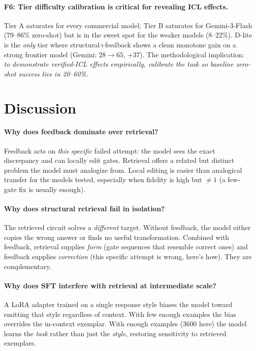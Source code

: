 \documentclass[11pt]{article}
\begin{document}
\paragraph{F6: Tier difficulty calibration is critical for revealing ICL effects.}
Tier A saturates for every commercial model; Tier B saturates for Gemini-3-Flash (79--86\% zero-shot) but is in the sweet spot for the weaker models (8--22\%). D-lite is the \emph{only} tier where structural+feedback shows a clean monotone gain on a strong frontier model (Gemini: $28\to65$, $+37$). The methodological implication: \emph{to demonstrate verified-ICL effects empirically, calibrate the task so baseline zero-shot success lies in 20--60\%.}

\section{Discussion}

\paragraph{Why does feedback dominate over retrieval?} Feedback acts on \emph{this specific} failed attempt: the model sees the exact discrepancy and can locally edit gates. Retrieval offers a related but distinct problem the model must analogize from. Local editing is easier than analogical transfer for the models tested, especially when fidelity is high but $\ne 1$ (a few-gate fix is usually enough).

\paragraph{Why does structural retrieval fail in isolation?} The retrieved circuit solves a \emph{different} target. Without feedback, the model either copies the wrong answer or finds no useful transformation. Combined with feedback, retrieval supplies \emph{form} (gate sequences that resemble correct ones) and feedback supplies \emph{correction} (this specific attempt is wrong, here's how). They are complementary.

\paragraph{Why does SFT interfere with retrieval at intermediate scale?} A LoRA adapter trained on a single response style biases the model toward emitting that style regardless of context. With few enough examples the bias overrides the in-context exemplar. With enough examples (3600 here) the model learns the \emph{task} rather than just the \emph{style}, restoring sensitivity to retrieved exemplars.
\end{document}
